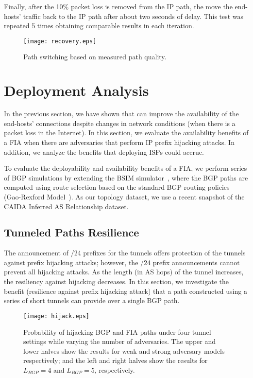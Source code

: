 Finally, after the 10\% packet loss is removed from the IP path, the \names
move the end-hosts' traffic back to the IP path after about two seconds of
delay. This test was repeated 5 times obtaining comparable results in each
iteration.

\begin{figure}
\centering
\texttt{[image: recovery.eps]}
\caption{Path switching based on measured path quality.}
\label{fig:recovery}
\end{figure}

\section{Deployment Analysis}
\label{ssec:simulation}
In the previous section, we have shown that \name can improve the availability
of the end-hosts' connections despite changes in network conditions (\eg when
there is a packet loss in the Internet). In this section, we evaluate the
availability benefits of a FIA when there are adversaries that perform IP
prefix hijacking attacks. In addition, we analyze the benefits that deploying
ISPs could accrue.

To evaluate the deployability and availability benefits of a FIA, we perform
series of BGP simulations by extending the BSIM simulator~\cite{PG-BGP}, where
the BGP paths are computed using route selection based on the standard BGP
routing policies (Gao-Rexford Model~\cite{gao_rexford}). As our topology
dataset, we use a recent snapshot of the CAIDA Inferred AS Relationship
dataset.

\subsection{Tunneled Paths Resilience}
\label{sssec:tun_resiliency}

The announcement of /24 prefixes for the tunnels offers protection of the
tunnels against prefix hijacking attacks; however, the /24 prefix announcements
cannot prevent all hijacking attacks. As the length (in AS hops) of the tunnel
increases, the resiliency against hijacking decreases.  In this section, we
investigate the benefit (\ie resilience against prefix hijacking attack) that a
path constructed using a series of short tunnels can provide over a single BGP
path.

\begin{figure*}[!ht]
	\center
	\texttt{[image: hijack.eps]}

	\caption{Probability of hijacking BGP and FIA paths under four tunnel
settings while varying the number of adversaries. The upper and lower halves
show the results for weak and strong adversary models respectively; and the
left and right halves show the results for $L_{BGP}=4$ and $L_{BGP}=5$, respectively.}

	\label{fig:sim-hijack}                                                      
	 
\end{figure*}

